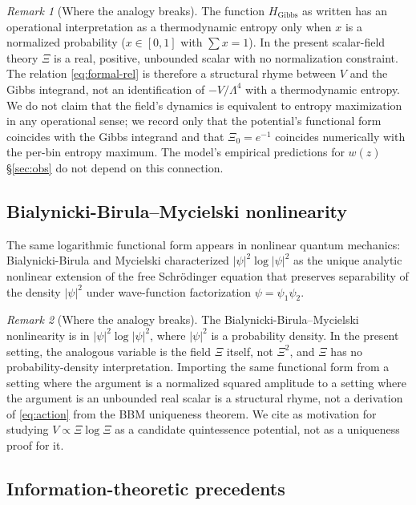 \documentclass[11pt,reqno]{amsart}
\theoremstyle{plain}
\theoremstyle{definition}
\theoremstyle{remark}
\newtheorem*{remark}{Remark}
\newcommand{\Gibbs}{\mathrm{Gibbs}}
\begin{document}
\begin{remark}[Where the analogy breaks]
The function $H_{\Gibbs}$ as written has an operational interpretation
as a thermodynamic entropy only when $x$ is a normalized probability
($x \in [0,1]$ with $\sum x = 1$). In the present scalar-field theory
$\Xi$ is a real, positive, unbounded scalar with no normalization
constraint. The relation \eqref{eq:formal-rel} is therefore a
structural rhyme between $V$ and the Gibbs integrand, not an
identification of $-V/\Lambda^{4}$ with a thermodynamic entropy.
We do not claim that the field's dynamics is equivalent to entropy
maximization in any operational sense; we record only that the
potential's functional form coincides with the Gibbs integrand and
that $\Xi_0 = e^{-1}$ coincides numerically with the per-bin
entropy maximum. The model's empirical predictions for $w(z)$
\S\ref{sec:obs} do not depend on this connection.
\end{remark}

\subsection{Bialynicki-Birula--Mycielski nonlinearity}

The same logarithmic functional form appears in nonlinear quantum
mechanics: Bialynicki-Birula and Mycielski
\cite{BialynickiBirulaMycielski1976} characterized
$|\psi|^{2} \log |\psi|^{2}$ as the unique analytic nonlinear extension
of the free Schr\"odinger equation that preserves separability of the
density $|\psi|^{2}$ under wave-function factorization
$\psi = \psi_1 \psi_2$.

\begin{remark}[Where the analogy breaks]
The Bialynicki-Birula--Mycielski nonlinearity is in
$|\psi|^{2}\log|\psi|^{2}$, where $|\psi|^{2}$ is a probability density.
In the present setting, the analogous variable is the field $\Xi$
itself, not $\Xi^{2}$, and $\Xi$ has no probability-density
interpretation. Importing the same functional form from a setting
where the argument is a normalized squared amplitude to a setting where
the argument is an unbounded real scalar is a structural rhyme, not a
derivation of \eqref{eq:action} from the BBM uniqueness theorem. We
cite \cite{BialynickiBirulaMycielski1976,Rosen1969,CazenaveHaraux1980,HoeghKrohn1971}
as motivation for studying $V \propto \Xi\log\Xi$ as a candidate
quintessence potential, not as a uniqueness proof for it.
\end{remark}

\subsection{Information-theoretic precedents}
\end{document}
